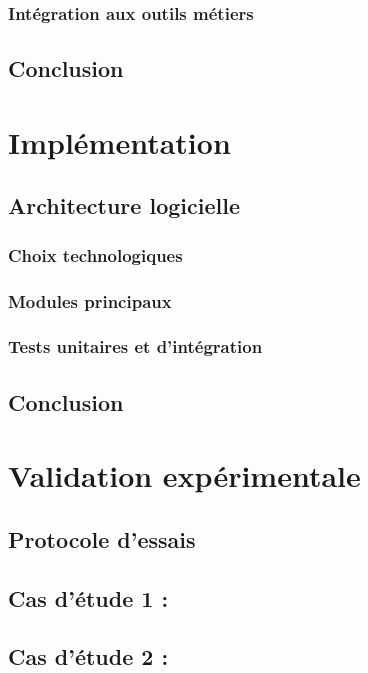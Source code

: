 \documentclass[a4paper,12pt]{article}
\begin{document}
\subsubsection{Intégration aux outils métiers}
\label{sec:org49b88de}
\subsection{Conclusion}
\label{sec:org623f16f}
\clearpage
\section{Implémentation}
\label{sec:org086f6d8}
\subsection{Architecture logicielle}
\label{sec:org70dbe78}
\subsubsection{Choix technologiques}
\label{sec:orgb68769b}
\subsubsection{Modules principaux}
\label{sec:orgc827ccb}
\subsubsection{Tests unitaires et d'intégration}
\label{sec:orgba61f67}
\subsection{Conclusion}
\label{sec:org729b666}
\clearpage
\section{Validation expérimentale}
\label{sec:org3c0e874}
\subsection{Protocole d'essais}
\label{sec:org4c7b5ff}

\subsection{Cas d'étude 1 :}
\label{sec:orga431f3d}
\subsection{Cas d'étude 2 :}
\label{sec:org189adca}
\end{document}
